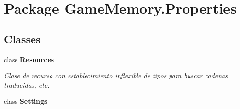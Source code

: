 \hypertarget{namespace_game_memory_1_1_properties}{\section{Package Game\-Memory.\-Properties}
\label{namespace_game_memory_1_1_properties}
}
\subsection*{Classes}
\begin{DoxyCompactItemize}
\item 
class {\bfseries Resources}
\begin{DoxyCompactList}\small\item\em Clase de recurso con establecimiento inflexible de tipos para buscar cadenas traducidas, etc. \end{DoxyCompactList}\item 
class {\bfseries Settings}
\end{DoxyCompactItemize}
